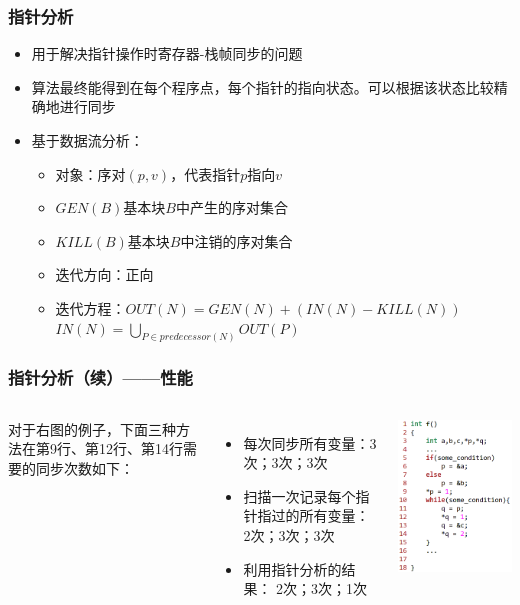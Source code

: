 \documentclass{beamer}
\begin{document}
\begin{frame}
	\frametitle{指针分析}
		\begin{itemize}
			\item 用于解决指针操作时寄存器-栈帧同步的问题
			\item 算法最终能得到在每个程序点，每个指针的指向状态。可以根据该状态比较精确地进行同步
			\item 基于数据流分析：
			\begin{itemize}
				\item 对象：序对$(p,v)$，代表指针$p$指向$v$
				\item $GEN(B)$基本块$B$中产生的序对集合
				\item $KILL(B)$基本块$B$中注销的序对集合
				\item 迭代方向：正向
				\item 迭代方程：$OUT(N) = GEN(N)+(IN(N)-KILL(N))$ $IN(N)=\bigcup_{P\in predecessor(N)}OUT(P)$
			\end{itemize}
		\end{itemize}
\end{frame}
\begin{frame}
	\frametitle{指针分析（续）——性能}
	\begin{columns}
		\noindent
		对于右图的例子，下面三种方法在第9行、第12行、第14行需要的同步次数如下：
		\begin{itemize}
			\item 每次同步所有变量：3次；3次；3次
			\item 扫描一次记录每个指针指过的所有变量： \alert{2次}；3次；3次
			\item 利用指针分析的结果： \alert{2次}；3次；\alert{1次}			
		\end{itemize}
		\includegraphics[scale=0.33]{pointer_analysis_example.png}
	\end{columns}
\end{frame}
\end{document}
